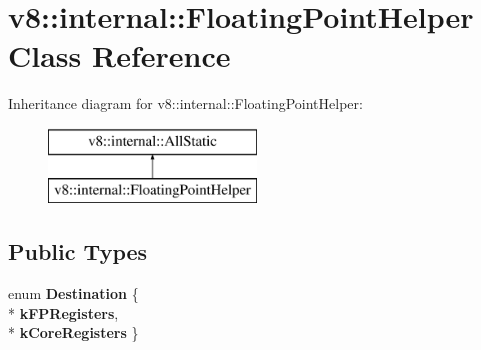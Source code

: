 \hypertarget{classv8_1_1internal_1_1_floating_point_helper}{}\section{v8\+:\+:internal\+:\+:Floating\+Point\+Helper Class Reference}
\label{classv8_1_1internal_1_1_floating_point_helper}
Inheritance diagram for v8\+:\+:internal\+:\+:Floating\+Point\+Helper\+:\begin{figure}[H]
\begin{center}
\leavevmode
\includegraphics[height=2.000000cm]{classv8_1_1internal_1_1_floating_point_helper}
\end{center}
\end{figure}
\subsection*{Public Types}
\begin{DoxyCompactItemize}
\item 
enum {\bfseries Destination} \{ \\*
{\bfseries k\+F\+P\+Registers}, 
\\*
{\bfseries k\+Core\+Registers}
 \}\hypertarget{classv8_1_1internal_1_1_floating_point_helper_ae500ce4e5ddf8e0a9e26d134f02056d5}{}\label{classv8_1_1internal_1_1_floating_point_helper_ae500ce4e5ddf8e0a9e26d134f02056d5}

\end{DoxyCompactItemize}
